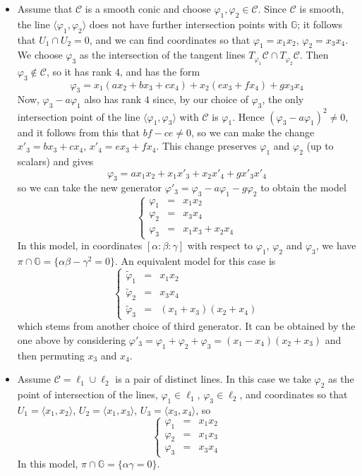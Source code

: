 \documentclass[10pt,reqno]{amsart}
\newcommand{\la}{\langle}
\newcommand{\ra}{\rangle}
\newcommand{\GG}{\mathbb{G}}
\renewcommand{\a}{\alpha}
\renewcommand{\b}{\beta}
\newcommand{\g}{\gamma}
\newcommand{\f}{\varphi}
\theoremstyle{definition}
\begin{document}
\begin{itemize}
\item Assume that $\mathscr{C}$ is a smooth conic and choose $\f_1, \f_2 \in \mathscr{C}$. Since $\mathscr{C}$ is smooth, the line $\la \f_1, \f_2 \ra$ does not have further intersection points with $\GG$; it follows that $U_1\cap U_2=0$, and we can find coordinates so that $\f_1=x_1x_2$, $\f_2=x_3x_4$. We choose $\f_3$ as the intersection of the tangent lines $T_{\f_1}\mathscr{C} \cap T_{\f_2}\mathscr{C}$. Then $\f_3\notin\mathscr{C}$, so it has rank $4$, and has the form 
\[
\f_3=x_1(ax_2+bx_3+cx_4)+x_2(ex_3+fx_4)+gx_3x_4
\]
Now, $\f_3-a\f_1$ also has rank $4$ since, by our choice of $\f_3$, the only intersection point of the line $\la \f_1, \f_3 \ra$ with $\mathscr{C}$ is $\f_1$. Hence $(\f_3-a\f_1)^2\neq 0$, and it follows from this that $bf-ce \ne 0$, so we can make the change $x'_3=bx_3+cx_4$, $x'_4=ex_3+fx_4$. This change preserves $\f_1$ and $\f_2$ (up to scalars) and gives
\[
\f_3=ax_1x_2 + x_1x'_3+x_2x'_4+ gx'_3x'_4
\]
so we can take the new generator $\f'_3=\f_3-a\f_1-g\f_2$ to obtain the model
\[ 
\left\{\begin{array}{ccl}
 \f_1 & = & x_1x_2\\
 \f_2 & = & x_3x_4\\
 \f_3 & = & x_1x_3+x_2x_4
\end{array}\right.
\]
In this model, in coordinates $[\a: \b: \g]$ with respect to $\f_1$, $\f_2$ and $\f_3$, we have $\pi \cap \GG=\{\a \b - \g^2=0\}$. An equivalent model for this case is
\[ 
\left\{\begin{array}{ccl}
 \tilde{\f}_1 & = & x_1x_2\\
 \tilde{\f}_2 & = & x_3x_4\\
 \tilde{\f}_3 & = & (x_1+x_3)(x_2+x_4)
\end{array}\right.
\]
which stems from another choice of third generator. It can be obtained by the one above by considering $\f'_3=\f_1+\f_2+\f_3=(x_1-x_4)(x_2+x_3)$ and then permuting $x_3$ and $x_4$. 

\medskip

\item Assume $\mathscr{C}=\ell_1 \cup \ell_2$ is a pair of distinct lines. In this case we take $\f_2$ as the point of intersection of the lines, $\f_1 \in \ell_1$, $\f_3 \in \ell_2$, and coordinates so that $U_1=\la x_1,x_2 \ra$, $U_2=\la x_1, x_3 \ra$, $U_3=\la x_3,x_4 \ra$, so
\[ 
\left\{\begin{array}{ccl}
 \f_1 & = & x_1x_2\\
 \f_2 & = & x_1x_3\\
 \f_3 & = & x_3x_4
\end{array}\right.
\]
In this model, $\pi \cap \GG=\{\a \g=0\}$.



\end{itemize}
\end{document}
